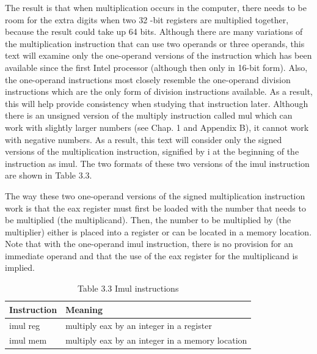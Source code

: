 \documentclass[10pt]{article}
\begin{document}
The result is that when multiplication occurs in the computer, there needs to be room for the extra digits when two 32 -bit registers are multiplied together, because the result could take up 64 bits. Although there are many variations of the multiplication instruction that can use two operands or three operands, this text will examine only the one-operand versions of the instruction which has been available since the first Intel processor (although then only in 16-bit form). Also, the one-operand instructions most closely resemble the one-operand division instructions which are the only form of division instructions available. As a result, this will help provide consistency when studying that instruction later. Although there is an unsigned version of the multiply instruction called mul which can work with slightly larger numbers (see Chap. 1 and Appendix B), it cannot work with negative numbers. As a result, this text will consider only the signed versions of the multiplication instruction, signified by i at the beginning of the instruction as imul. The two formats of these two versions of the imul instruction are shown in Table 3.3.

The way these two one-operand versions of the signed multiplication instruction work is that the eax register must first be loaded with the number that needs to be multiplied (the multiplicand). Then, the number to be multiplied by (the multiplier) either is placed into a register or can be located in a memory location. Note that with the one-operand imul instruction, there is no provision for an immediate operand and that the use of the eax register for the multiplicand is implied.

\begin{table}[h]
\begin{center}
\captionsetup{labelformat=empty}
\caption{Table 3.3 Imul instructions}
\begin{tabular}{|l|l|}
\hline
Instruction & Meaning \\
\hline
imul reg & multiply eax by an integer in a register \\
\hline
imul mem & multiply eax by an integer in a memory location \\
\hline
\end{tabular}
\end{center}
\end{table}
\end{document}
